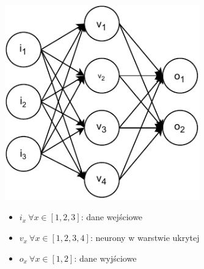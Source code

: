 \begin{figure}[H]
    \centering
    \includegraphics[width=0.75\textwidth]{images/neural-network}
    \begin{itemize}
    \item[] $i_x \ \forall x \in [1, 2, 3]$: dane wejściowe
    \item[] $v_x \ \forall x \in [1, 2, 3, 4]$: neurony w warstwie ukrytej
    \item[] $o_x \ \forall x \in [1, 2]$: dane wyjściowe
    \end{itemize}
    \label{fig:neural-network}
\end{figure}

